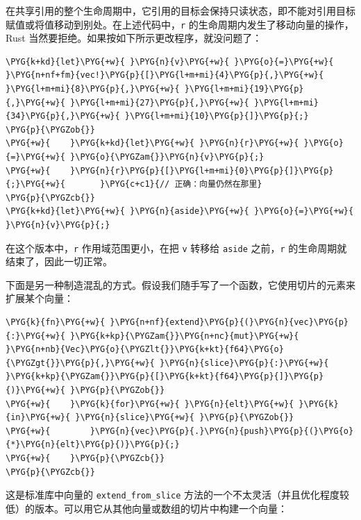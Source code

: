 在共享引用的整个生命周期中，它引用的目标会保持只读状态，即不能对引用目标赋值或将值移动到别处。在上述代码中，\texttt{r} 的生命周期内发生了移动向量的操作，Rust 当然要拒绝。如果按如下所示更改程序，就没问题了：

\begin{Verbatim}[commandchars=\\\{\},breaklines=true,breakanywhere=true,fontsize=\codefont,xleftmargin=17bp]
\PYG{k+kd}{let}\PYG{+w}{ }\PYG{n}{v}\PYG{+w}{ }\PYG{o}{=}\PYG{+w}{ }\PYG{n+nf+fm}{vec!}\PYG{p}{[}\PYG{l+m+mi}{4}\PYG{p}{,}\PYG{+w}{ }\PYG{l+m+mi}{8}\PYG{p}{,}\PYG{+w}{ }\PYG{l+m+mi}{19}\PYG{p}{,}\PYG{+w}{ }\PYG{l+m+mi}{27}\PYG{p}{,}\PYG{+w}{ }\PYG{l+m+mi}{34}\PYG{p}{,}\PYG{+w}{ }\PYG{l+m+mi}{10}\PYG{p}{]}\PYG{p}{;}
\PYG{p}{\PYGZob{}}
\PYG{+w}{    }\PYG{k+kd}{let}\PYG{+w}{ }\PYG{n}{r}\PYG{+w}{ }\PYG{o}{=}\PYG{+w}{ }\PYG{o}{\PYGZam{}}\PYG{n}{v}\PYG{p}{;}
\PYG{+w}{    }\PYG{n}{r}\PYG{p}{[}\PYG{l+m+mi}{0}\PYG{p}{]}\PYG{p}{;}\PYG{+w}{       }\PYG{c+c1}{// 正确：向量仍然在那里}
\PYG{p}{\PYGZcb{}}
\PYG{k+kd}{let}\PYG{+w}{ }\PYG{n}{aside}\PYG{+w}{ }\PYG{o}{=}\PYG{+w}{ }\PYG{n}{v}\PYG{p}{;}
\end{Verbatim}

在这个版本中，\texttt{r} 作用域范围更小，在把 \texttt{v} 转移给 \texttt{aside} 之前，\texttt{r} 的生命周期就结束了，因此一切正常。

下面是另一种制造混乱的方式。假设我们随手写了一个函数，它使用切片的元素来扩展某个向量：

\begin{Verbatim}[commandchars=\\\{\},breaklines=true,breakanywhere=true,fontsize=\codefont,xleftmargin=17bp]
\PYG{k}{fn}\PYG{+w}{ }\PYG{n+nf}{extend}\PYG{p}{(}\PYG{n}{vec}\PYG{p}{:}\PYG{+w}{ }\PYG{k+kp}{\PYGZam{}}\PYG{n+nc}{mut}\PYG{+w}{ }\PYG{n+nb}{Vec}\PYG{o}{\PYGZlt{}}\PYG{k+kt}{f64}\PYG{o}{\PYGZgt{}}\PYG{p}{,}\PYG{+w}{ }\PYG{n}{slice}\PYG{p}{:}\PYG{+w}{ }\PYG{k+kp}{\PYGZam{}}\PYG{p}{[}\PYG{k+kt}{f64}\PYG{p}{]}\PYG{p}{)}\PYG{+w}{ }\PYG{p}{\PYGZob{}}
\PYG{+w}{    }\PYG{k}{for}\PYG{+w}{ }\PYG{n}{elt}\PYG{+w}{ }\PYG{k}{in}\PYG{+w}{ }\PYG{n}{slice}\PYG{+w}{ }\PYG{p}{\PYGZob{}}
\PYG{+w}{        }\PYG{n}{vec}\PYG{p}{.}\PYG{n}{push}\PYG{p}{(}\PYG{o}{*}\PYG{n}{elt}\PYG{p}{)}\PYG{p}{;}
\PYG{+w}{    }\PYG{p}{\PYGZcb{}}
\PYG{p}{\PYGZcb{}}
\end{Verbatim}

这是标准库中向量的 \texttt{extend\_from\_slice} 方法的一个不太灵活（并且优化程度较低）的版本。可以用它从其他向量或数组的切片中构建一个向量：


